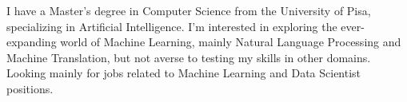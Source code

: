 
\begin{cvparagraph}

I have a Master's degree in Computer Science from the University of Pisa, specializing in Artificial Intelligence. I'm interested in exploring the ever-expanding world of Machine Learning, mainly Natural Language Processing and Machine Translation, but not averse to testing my skills in other domains. Looking mainly for jobs related to Machine Learning and Data Scientist positions.
\end{cvparagraph}
